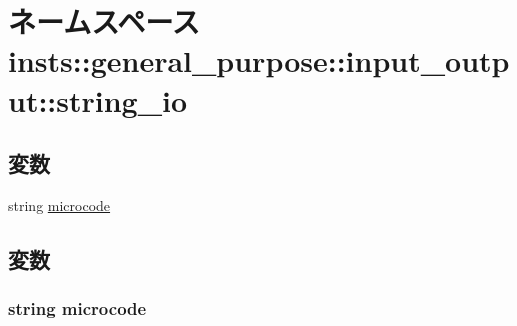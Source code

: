 \hypertarget{namespaceinsts_1_1general__purpose_1_1input__output_1_1string__io}{
\section{ネームスペース insts::general\_\-purpose::input\_\-output::string\_\-io}
\label{namespaceinsts_1_1general__purpose_1_1input__output_1_1string__io}
}
\subsection*{変数}
\begin{DoxyCompactItemize}
\item 
string \hyperlink{namespaceinsts_1_1general__purpose_1_1input__output_1_1string__io_a770f11a173e99389a8802f0107ed8f52}{microcode}
\end{DoxyCompactItemize}


\subsection{変数}
\hypertarget{namespaceinsts_1_1general__purpose_1_1input__output_1_1string__io_a770f11a173e99389a8802f0107ed8f52}{
\subsubsection[{microcode}]{\setlength{\rightskip}{0pt plus 5cm}string {\bf microcode}}}
\label{namespaceinsts_1_1general__purpose_1_1input__output_1_1string__io_a770f11a173e99389a8802f0107ed8f52}
